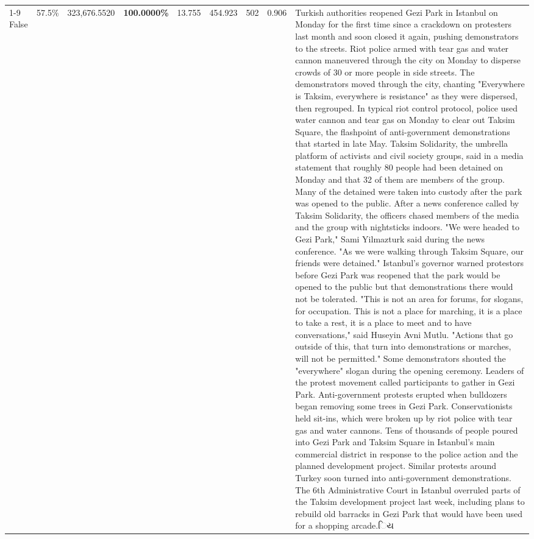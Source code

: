 \begin{table}[H]
\begin{tabular}{lllrlllll}
\cline{1-9}
False & 57.5\% & 323,676.5520 & \bfseries \color{red} 100.0000\% & 13.755 & 454.923 & 502 & 0.906 & Turkish authorities reopened Gezi Park in Istanbul on Monday for the first time since a crackdown on protesters last month and soon closed it again, pushing demonstrators to the streets. Riot police armed with tear gas and water cannon maneuvered through the city on Monday to disperse crowds of 30 or more people in side streets. The demonstrators moved through the city, chanting "Everywhere is Taksim, everywhere is resistance" as they were dispersed, then regrouped. In typical riot control protocol, police used water cannon and tear gas on Monday to clear out Taksim Square, the flashpoint of anti-government demonstrations that started in late May. Taksim Solidarity, the umbrella platform of activists and civil society groups, said in a media statement that roughly 80 people had been detained on Monday and that 32 of them are members of the group. Many of the detained were taken into custody after the park was opened to the public. After a news conference called by Taksim Solidarity, the officers chased members of the media and the group with nightsticks indoors. "We were headed to Gezi Park," Sami Yilmazturk said during the news conference. "As we were walking through Taksim Square, our friends were detained." Istanbul's governor warned protestors before Gezi Park was reopened that the park would be opened to the public but that demonstrations there would not be tolerated. "This is not an area for forums, for slogans, for occupation. This is not a place for marching, it is a place to take a rest, it is a place to meet and to have conversations," said Huseyin Avni Mutlu. "Actions that go outside of this, that turn into demonstrations or marches, will not be permitted." Some demonstrators shouted the "everywhere" slogan during the opening ceremony. Leaders of the protest movement called participants to gather in Gezi Park. Anti-government protests erupted when bulldozers began removing some trees in Gezi Park. Conservationists held sit-ins, which were broken up by riot police with tear gas and water cannons. Tens of thousands of people poured into Gezi Park and Taksim Square in Istanbul's main commercial district in response to the police action and the planned development project. Similar protests around Turkey soon turned into anti-government demonstrations. The 6th Administrative Court in Istanbul overruled parts of the Taksim development project last week, including plans to rebuild old barracks in Gezi Park that would have been used for a shopping arcade.િય \\

\end{tabular}
\end{table}
